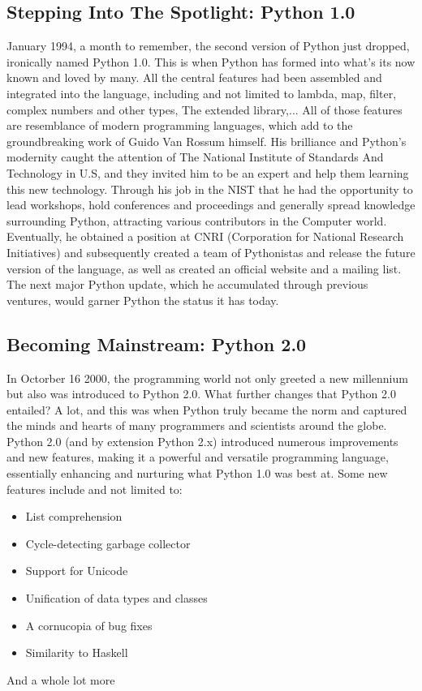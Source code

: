 \documentclass[twoside,final]{hcmut-report}
\begin{document}
\subsection{Stepping Into The Spotlight: Python 1.0}
\hspace*{3mm} January 1994, a month to remember, the second version of Python just dropped, ironically named Python 1.0. This is when Python has formed into what's its now known and loved by many. All the central features had been assembled and integrated into the language, including and not limited to lambda, map, filter, complex numbers and other types, The extended library,... All of those features are resemblance of modern programming languages, which add to the groundbreaking work of Guido Van Rossum himself. His brilliance and Python's modernity caught the attention of The National Institute of Standards And Technology in U.S, and they invited him to be an expert and help them learning this new technology. Through his job in the NIST that he had the opportunity to lead workshops, hold conferences and proceedings and generally spread knowledge surrounding Python, attracting various contributors in the Computer world. Eventually, he obtained a position at CNRI (Corporation for National Research Initiatives) and subsequently created a team of Pythonistas and release the future version of the language, as well as created an official website and a mailing list.
\\
\hspace*{3mm} The next major Python update, which he accumulated through previous ventures, would garner Python the status it has today.

\subsection{Becoming Mainstream: Python 2.0}
\hspace*{3mm}In Octorber 16 2000, the programming world not only greeted a new millennium but also was introduced to Python 2.0. What further changes that Python 2.0 entailed? A lot, and this was when Python truly became the norm and captured the minds and hearts of many programmers and scientists around the globe. Python 2.0 (and by extension Python 2.x) introduced numerous improvements and new features, making it a powerful and versatile programming language, essentially enhancing and nurturing what Python 1.0 was best at. Some new features include and not limited to:

\begin{itemize}
\item List comprehension
\item Cycle-detecting garbage collector
\item Support for Unicode
\item Unification of data types and classes
\item A cornucopia of bug fixes
\item Similarity to Haskell

\end{itemize}
And a whole lot more\\
\end{document}
